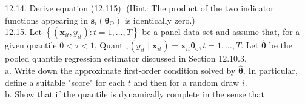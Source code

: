 \documentclass[10pt]{article}
\begin{document}
12.14. Derive equation (12.115). (Hint: The product of the two indicator functions appearing in $\mathbf{s}_{i}\left(\boldsymbol{\theta}_{\mathrm{O}}\right)$ is identically zero.)\\
12.15. Let $\left\{\left(\mathbf{x}_{i t}, y_{i t}\right): t=1, \ldots, T\right\}$ be a panel data set and assume that, for a given quantile $0<\tau<1$, Quant ${ }_{\tau}\left(y_{i t} \mid \mathbf{x}_{i t}\right)=\mathbf{x}_{i t} \boldsymbol{\theta}_{\mathrm{o}}, t=1, \ldots, T$. Let $\hat{\boldsymbol{\theta}}$ be the pooled quantile regression estimator discussed in Section 12.10.3.\\
a. Write down the approximate first-order condition solved by $\hat{\boldsymbol{\theta}}$. In particular, define a suitable "score" for each $t$ and then for a random draw $i$.\\
b. Show that if the quantile is dynamically complete in the sense that
\end{document}
